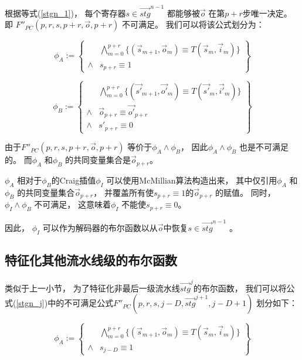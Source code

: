 根据等式(\ref{stgn_1})，
每个寄存器$s\in \vec{stg}^{n-1}$ 都能够被$\vec{o}$ 在第$p+r$步唯一决定。
即
$F''_{PC}(p,r,s,p+r,\vec{o},p+r)$ 不可满足。
我们可以将该公式划分为：

\begin{equation}
 \phi_A :=
 \left\{
\begin{array}{cc}
&\bigwedge_{m=0}^{p+r}
\{
(\vec{s}_{m+1},\vec{o}_m)\equiv T(\vec{s}_m,\vec{i}_m)
\}
\\
\wedge& s_{p+r}\equiv 1
\end{array}
\right\}
\end{equation}

\begin{equation}
\phi_B :=
\left\{
\begin{array}{cc}
&\bigwedge_{m=0}^{p+r}
\{
(\vec{s'}_{m+1},\vec{o'}_m)\equiv T(\vec{s'}_m,\vec{i'}_m)
\}
\\
\wedge&\vec{o}_{p+r}\equiv \vec{o'}_{p+r} \\
\wedge& s'_{p+r}\equiv 0
\end{array}
\right\}
\end{equation}

由于$F''_{PC}(p,r,s,p+r,\vec{o},p+r)$ 等价于$\phi_A \wedge \phi_B$，
因此$\phi_A \wedge \phi_B$ 也是不可满足的。
而$\phi_A$ 和$\phi_B$ 的共同变量集合是$\vec{o}_{p+r}$。


$\phi_A$ 相对于$\phi_B$的Craig插值$\phi_I$ 可以使用McMillian算法构造出来，
其中仅引用$\phi_A$ 和$\phi_B$ 的共同变量集合$\vec{o}_{p+r}$，
并覆盖所有使$s_{p+r}\equiv 1$的$\vec{o}_{p+r}$ 的赋值。
同时，
$\phi_I\wedge \phi_B$  不可满足，
这意味着$\phi_I$ 不能使$s_{p+r}\equiv 0$。

因此，
$\phi_I$ 可以作为解码器的布尔函数以从$\vec{o}$中恢复$s\in \vec{stg}^{n-1}$ 。

\subsection{特征化其他流水线级的布尔函数}
类似于上一小节，
为了特征化非最后一级流水线$\vec{stg}^j$的布尔函数，
我们可以将公式(\ref{stgn_j})中的不可满足公式$F''_{PC}(p,r,s,j-D,\vec{stg}^{j+1},j-D+1)$
划分如下：

\begin{equation}
 \phi_A :=
 \left\{
\begin{array}{cc}
&\bigwedge_{m=0}^{p+r}
\{
(\vec{s}_{m+1},\vec{o}_m)\equiv T(\vec{s}_m,\vec{i}_m)
\}
\\
\wedge& s_{j-D}\equiv 1
\end{array}
\right\}
\end{equation}


